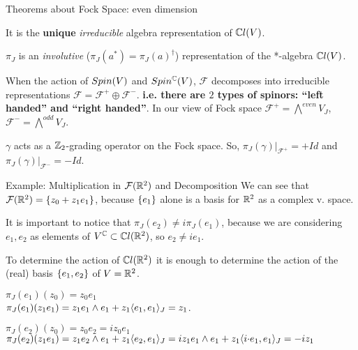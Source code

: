 \begin{frame}{Theorems about Fock Space: even dimension} %
    \begin{theorem} It is the \textbf{unique} \emph{irreducible} algebra representation of $\mathbb C l(V)$.\end{theorem}%

    \begin{theorem}$\pi_J$ is an \emph{involutive} ($\pi_J(a^*) = \pi_J(a)^\dagger$) representation of the *-algebra $\mathbb C l(V)$.\end{theorem}%
    
    \begin{theorem}
    When the action of $Spin(V)$ and $Spin^\mathbb C(V)$, $\mathcal F$ decomposes into irreducible representations $\mathcal F = \mathcal F^+ \oplus \mathcal F^-$. \textbf{i.e. there are $2$ types of spinors: ``left handed'' and ``right handed''}. \tiny {In our view of Fock space $\mathcal F^+ = \bigwedge^{even}V_J$, $\mathcal F^- = \bigwedge^{odd}V_J$. }
    \end{theorem}
    
    \begin{proposition} $\gamma$ acts as a $\mathbb Z_2$-grading operator on the Fock space. So,  $\pi_J(\gamma)|_{\mathcal F^+} = +Id$ and $\pi_J(\gamma)|_{\mathcal F^-} = -Id$. \end{proposition}%

\end{frame}

\begin{frame}{Example: Multiplication in $\mathcal F(\mathbb R^2)$ and Decomposition} %
    We can see that $\mathcal F(\mathbb R^2) = \{z_0 + z_1 e_1\}$, because $\{e_1\}$ alone is a basis for $\mathbb R^2$ as a complex v. space.
    
    It is important to notice that $\pi_J(e_2) \neq i \pi_J(e_1)$, because we are considering $e_1, e_2$ as elements of $V^\mathbb C \subset \mathbb C l(\mathbb R^2)$, so $e_2 \neq i e_1$.
    
    To determine the action of $\mathbb C l(\mathbb R^2)$ it is enough to determine the action of the (real) basis $\{e_1, e_2\}$ of $V = \mathbb R^2$.
    
    
    $\pi_J(e_1) (z_0) = z_0 e_1$\\
    $\pi_J(e_1)(z_1 e_1) = z_1 e_1 \wedge e_1 + z_1 \langle e_1, e_1\rangle_J = z_1$.
    
    
    $\pi_J(e_2) (z_0) = z_0 e_2 = i z_0 e_1$ \\
    $\pi_J(e_2)(z_1 e_1) = z_1 e_2 \wedge e_1 + z_1 \langle e_2, e_1\rangle_J = i z_1 e_1 \wedge e_1 + z_1\langle i\tiny{ \cdot }e_1, e_1 \rangle_J = -i z_1$
    
\end{frame}

